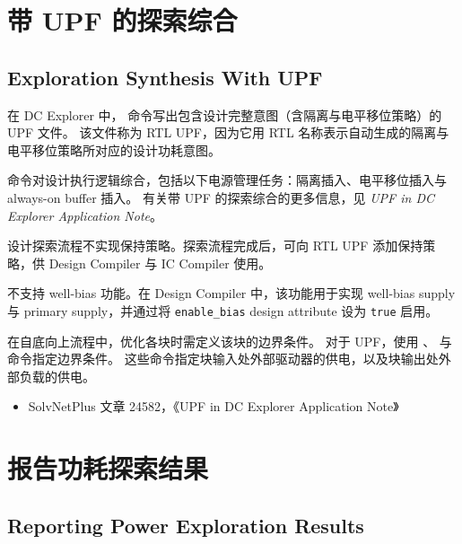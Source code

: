 \section{带 UPF 的探索综合}
\subsection*{Exploration Synthesis With UPF}

在 DC Explorer 中， 命令写出包含设计完整意图（含隔离与电平移位策略）的 UPF 文件。
该文件称为 RTL UPF，因为它用 RTL 名称表示自动生成的隔离与电平移位策略所对应的设计功耗意图。

 命令对设计执行逻辑综合，包括以下电源管理任务：隔离插入、电平移位插入与 always-on buffer 插入。
有关带 UPF 的探索综合的更多信息，见 \textit{UPF in DC Explorer Application Note}。

\begin{noteBox}
设计探索流程不实现保持策略。探索流程完成后，可向 RTL UPF 添加保持策略，供 Design Compiler 与 IC Compiler 使用。

不支持 well-bias 功能。在 Design Compiler 中，该功能用于实现 well-bias supply 与 primary supply，并通过将 \texttt{enable\_bias} design attribute 设为 \texttt{true} 启用。
\end{noteBox}

在自底向上流程中，优化各块时需定义该块的边界条件。
对于 UPF，使用 、  与   命令指定边界条件。
这些命令指定块输入处外部驱动器的供电，以及块输出处外部负载的供电。

\begin{seeAlsoBox}
\begin{itemize}
  \item SolvNetPlus 文章 24582，《UPF in DC Explorer Application Note》
\end{itemize}
\end{seeAlsoBox}

\section{报告功耗探索结果}
\subsection*{Reporting Power Exploration Results}


